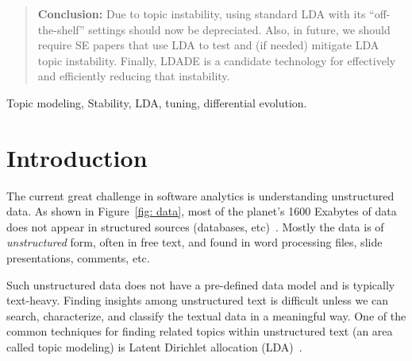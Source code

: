 \documentclass[twocolumn,5p,sort&compress]{elsarticle}
\theoremstyle{break}
\begin{document}
\begin{frontmatter}
\begin{abstract}
\noindent
\textbf{Conclusion:}
  Due to topic instability,
  using standard LDA with its ``off-the-shelf'' settings should now be depreciated.
  Also, in future,
we should require
SE
papers that use
LDA
to
test and (if needed) mitigate LDA topic instability.
  Finally, LDADE is a candidate technology for effectively and efficiently reducing that instability.  
\end{abstract}

\begin{keyword}
Topic modeling, Stability, LDA, tuning, differential evolution.
\end{keyword}

\end{frontmatter}



\section{Introduction}
\label{sect:intro} 





The current great challenge in software analytics
is understanding unstructured data. As shown in Figure~\ref{fig:
data}, most of the planet's 1600 Exabytes of data does not appear
in structured sources (databases, etc)~\cite{nadkarni2014structured}.
Mostly the data is of {\em unstructured} form, often in free text, and found
in word processing files, slide presentations, comments, etc.

Such unstructured data does not have a pre-defined data model and
is typically text-heavy. Finding insights among unstructured text
is  difficult unless we can search, characterize, and classify the
textual data in a meaningful way. One of the common techniques for
finding related topics within unstructured text (an area called
topic modeling) is Latent Dirichlet allocation (LDA)~\cite{blei2003latent}.
\end{document}
